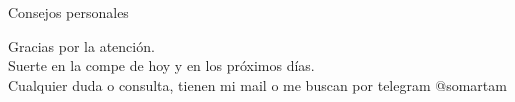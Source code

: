 \documentclass{beamer}
\begin{document}
\begin{frame}{Consejos personales}

  \centering
  \large
  Gracias por la atención. \\
  \vspace{0.4cm}
  Suerte en la compe de hoy y en los próximos días. \\
  \vspace{0.4cm}
  Cualquier duda o consulta, tienen mi mail o me buscan por telegram @somartam
  
\end{frame}
\end{document}
